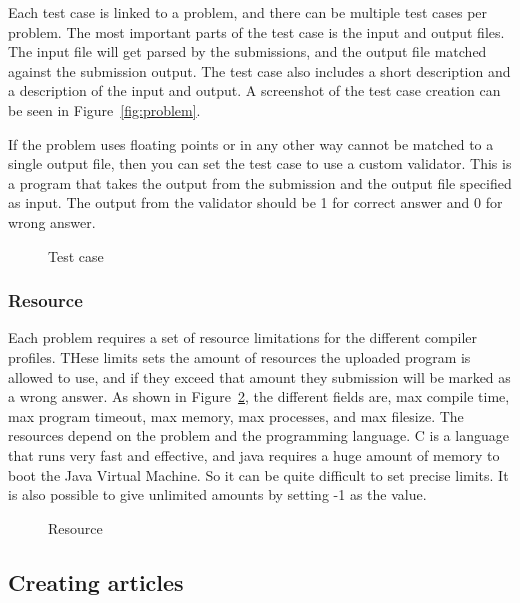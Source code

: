 Each test case is linked to a problem, and there can be multiple test
cases per problem. The most important parts of the test case is the
input and output files. The input file will get parsed by the
submissions, and the output file matched against the submission output.
The test case also includes a short description and a description of
the input and output. A screenshot of the test case creation can be
seen in Figure~\ref{fig:problem}. 


\bigskip

If the problem uses floating points or in any other way cannot be
matched to a single output file, then you can set the test case to use
a custom validator. This is a program that takes the output from the
submission and the output file specified as input. The output from the
validator should be 1 for correct answer and 0 for wrong answer. \ 

\begin{figure}
\centering
	\caption{Test case}
	\label{fig:testCase}
\end{figure}


\subsubsection{Resource}

Each problem requires a set of resource limitations for the different
compiler profiles. THese limits sets the amount of resources the
uploaded program is allowed to use, and if they exceed that amount they
submission will be marked as a wrong answer. As shown in Figure~\ref{fig:resource},
the different fields are, max compile time, max program timeout, max
memory, max processes, and max filesize. The resources depend on the
problem and the programming language. C is a language that runs very
fast and effective, and java requires a huge amount of memory to boot
the Java Virtual Machine. So it can be quite difficult to set precise
limits. It is also possible to give unlimited amounts by setting -1 as
the value.


\begin{figure}
\centering
	\caption{Resource}
	\label{fig:resource}
\end{figure}

\subsection{Creating articles}

